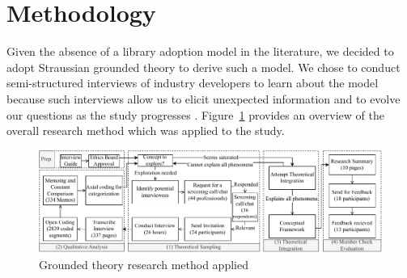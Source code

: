 \section{Methodology}\label{sec:methodology}
Given the absence of a library adoption model in the literature, we decided to adopt Straussian grounded theory \cite{corbin2014gt} to derive such a model.  
We chose to conduct semi-structured interviews of industry developers to learn about the model because such interviews allow us to elicit unexpected information and to evolve our questions as the study progresses \cite{HoveAnda, Seaman}. 
Figure~\ref{fig:methodology} provides an overview of the overall research method which was applied to the study.
\begin{figure}
    \centering
    \includegraphics[scale=.7]{images/methodology.pdf}
    \caption{Grounded theory research method applied}
    \label{fig:methodology}
\end{figure}







